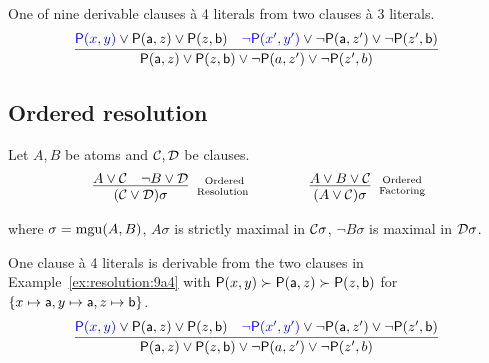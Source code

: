 \begin{example}\label{ex:resolution:9a4}
	One of { nine} derivable clauses à 4 literals from two clauses à 3 literals.
	\begin{gather*}
	\infer[]{\mP(\ma,z)\lor\mP(z,\mb)\lor\lnot\mP(a,z')\lor\lnot\mP(z',b)}
	{{\colN\mP(x,y)}\lor\mP(\ma,z)\lor\mP(z,\mb) & {\colN\lnot\mP(x',y')}\lor\lnot\mP(\ma,z')\lor\lnot\mP(z',\mb)}
	\end{gather*}
\end{example}

\subsection{Ordered resolution}\label{sec:ordered:resolution}

\begin{definition}\label{def:ordered:resolution}
	Let \( A, B \) be atoms and \( \mathcal{C},\mathcal{D} \) be clauses.
	\begin{gather*}
	\infer
	[\text{Ordered}\atop\text{Resolution	}]
	{(\mcC\lor\mcD)\sigma}
	{A\lor\mcC&\lnot B\lor\mcD}
	\qquad\qquad
	\infer
	[\text{Ordered}\atop\text{Factoring}]
	{(A\lor\mcC)\sigma}
	{A\lor B\lor\mcC}
	\end{gather*}
	\begin{center}
		where \( \sigma=\operatorname{mgu}(A,B) \),
		\( A\sigma \) is strictly maximal in \( \mathcal{C}\sigma \),
		\( \lnot B\sigma \) is maximal in \( \mathcal{D}\sigma \).
	\end{center}
\end{definition}

\begin{example}\label{ex:resolution:1a4}
	One clause à 4 literals is derivable from the two clauses
	in Example~\vref{ex:resolution:9a4} with
	\( \mathsf{P}(x,y)\succ\mathsf{P}(\mathsf{a},z)\succ\mathsf{P}(z,\mathsf{b}) \)
	for \( \{ x\mapsto\mathsf{a}, y\mapsto\mathsf{a},z\mapsto\mathsf{b} \} \).
	\begin{gather*}
	\infer[]{\mP(\ma,z)\lor\mP(z,\mb)\lor\lnot\mP(a,z')\lor\lnot\mP(z',b)}
	{{\colN\mP(x,y)}\lor\mP(\ma,z)\lor\mP(z,\mb) & {\colN\lnot\mP(x',y')}\lor\lnot\mP(\ma,z')\lor\lnot\mP(z',\mb)}
	\end{gather*}

\end{example}

